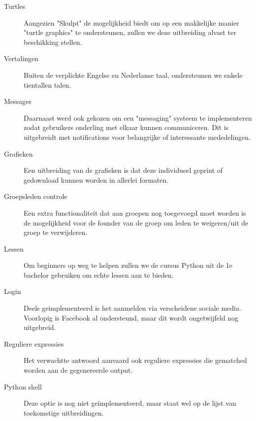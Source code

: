 \begin{description}
\item[Turtles] Aangezien "Skulpt" de mogelijkheid biedt om op een makkelijke manier "turtle graphics" te ondersteunen,
zullen we deze uitbreiding alvast ter beschikking stellen.
\item[Vertalingen] Buiten de verplichte Engelse en Nederlanse taal, ondersteunen we enkele tientallen talen.
\item[Messages] Daarnaast werd ook gekozen om een "messaging" systeem te implementeren zodat gebruikers onderling met elkaar
kunnen communiceren. Dit is uitgebreidt met notifications voor belangrijke of interessante mededelingen.
\item[Grafieken] Een uitbreiding van de grafieken is dat deze individueel geprint of gedownload kunnen worden in allerlei formaten.
\item[Groepsleden controle] Een extra functionaliteit dat aan groepen nog toegevoegd moet worden is de mogelijkheid voor de founder van de
groep om leden te weigeren/uit de groep te verwijderen.
\item[Lessen] Om beginners op weg te helpen zullen we de cursus Python uit de 1e bachelor gebruiken om echte lessen aan te bieden.
\item[Login] Deels geimplementeerd is het aanmelden via verscheidene sociale media. Voorlopig is Facebook al ondersteund, maar dit wordt
ongetwijfeld nog uitgebreid.
\item[Reguliere expressies] Het verwachtte antwoord aanvaard ook reguliere expressies die gematched worden aan de gegenereerde output.
\item[Python shell] Deze optie is nog niet ge\"{i}mplementeerd, maar staat wel op de lijst van toekomstige uitbreidingen.
\end{description}

